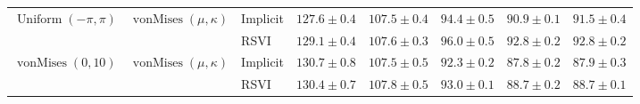 \documentclass{article}
\begin{document}
\begin{refsection}
\begin{table}
{\begin{tabular}{lllccccc}
\multirow{2}{*}{$\operatorname{Uniform}(-\pi, \pi)$} & \multirow{2}{*}{$\operatorname{vonMises}(\mu, \kappa)$} & Implicit & $127.6 \pm 0.4$ & $107.5 \pm 0.4$ & $94.4 \pm 0.5$ & $90.9 \pm 0.1$ & $91.5 \pm 0.4$ \\
 &  & RSVI & $129.1 \pm 0.4$ & $107.6 \pm 0.3$ & $96.0 \pm 0.5$ & $92.8 \pm 0.2$ & $92.8 \pm 0.2$ \\ \midrule
\multirow{2}{*}{$\operatorname{vonMises}(0, 10)$} & \multirow{2}{*}{$\operatorname{vonMises}(\mu, \kappa)$} & Implicit & $130.7 \pm 0.8$ & $107.5 \pm 0.5$ & $92.3 \pm 0.2$ & $87.8 \pm 0.2$ & $87.9 \pm 0.3$ \\
 &  & RSVI & $130.4 \pm 0.7$ & $107.8 \pm 0.5$ & $93.0 \pm 0.1$ & $88.7 \pm 0.2$ & $88.7 \pm 0.1$ \\
     \bottomrule
    \end{tabular}
    }
    \label{fig:vae-mnist-extended}
\end{table}
 \printbibliography
\end{refsection}
\end{document}
